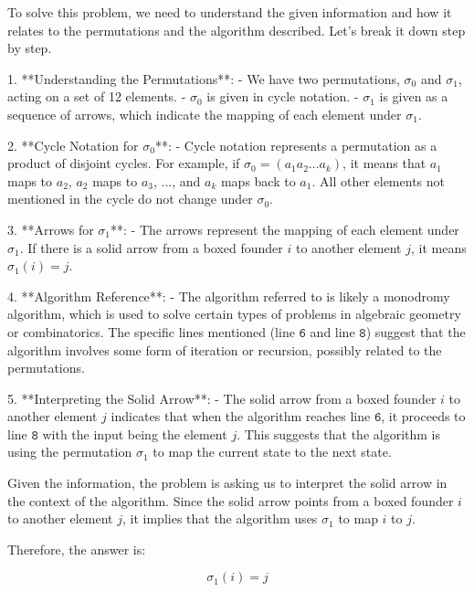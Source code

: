 To solve this problem, we need to understand the given information and how it relates to the permutations and the algorithm described. Let's break it down step by step.

1. **Understanding the Permutations**:
   - We have two permutations, \(\sigma_0\) and \(\sigma_1\), acting on a set of 12 elements.
   - \(\sigma_0\) is given in cycle notation.
   - \(\sigma_1\) is given as a sequence of arrows, which indicate the mapping of each element under \(\sigma_1\).

2. **Cycle Notation for \(\sigma_0\)**:
   - Cycle notation represents a permutation as a product of disjoint cycles. For example, if \(\sigma_0 = (a_1 a_2 \ldots a_k)\), it means that \(a_1\) maps to \(a_2\), \(a_2\) maps to \(a_3\), ..., and \(a_k\) maps back to \(a_1\). All other elements not mentioned in the cycle do not change under \(\sigma_0\).

3. **Arrows for \(\sigma_1\)**:
   - The arrows represent the mapping of each element under \(\sigma_1\). If there is a solid arrow from a boxed founder \(i\) to another element \(j\), it means \(\sigma_1(i) = j\).

4. **Algorithm Reference**:
   - The algorithm referred to is likely a monodromy algorithm, which is used to solve certain types of problems in algebraic geometry or combinatorics. The specific lines mentioned (line \(\texttt{6}\) and line \(\texttt{8}\)) suggest that the algorithm involves some form of iteration or recursion, possibly related to the permutations.

5. **Interpreting the Solid Arrow**:
   - The solid arrow from a boxed founder \(i\) to another element \(j\) indicates that when the algorithm reaches line \(\texttt{6}\), it proceeds to line \(\texttt{8}\) with the input being the element \(j\). This suggests that the algorithm is using the permutation \(\sigma_1\) to map the current state to the next state.

Given the information, the problem is asking us to interpret the solid arrow in the context of the algorithm. Since the solid arrow points from a boxed founder \(i\) to another element \(j\), it implies that the algorithm uses \(\sigma_1\) to map \(i\) to \(j\).

Therefore, the answer is:

\[
\boxed{\sigma_1(i) = j}
\]